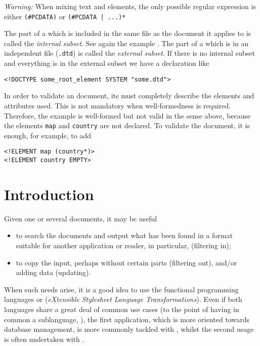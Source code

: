 \emph{Warning:} When mixing text and elements, the only possible
regular expression is either \verb|(#PCDATA)| or
\verb/(#PCDATA | ...)*/

The part of a \DTD which is included in the same file as the \XML
document it applies to is called the \emph{internal subset}. See
again the example . The part of a
\DTD which is in an independent file (\texttt{.dtd}) is called the
\emph{external subset}. If there is no internal subset and
everything is in the external subset we have a declaration like
\begin{verbatim}
<!DOCTYPE some_root_element SYSTEM "some.dtd">
\end{verbatim}
In order to validate an \XML document, its \DTD must completely
describe the elements and attributes used.  This is not mandatory when
well\hyp{}formedness is required. Therefore, the example
 is well\hyp{}formed but not valid in
the sense above, because the elements \texttt{map} and
\texttt{country} are not declared. To validate the document, it is
enough, for example, to add
\begin{verbatim}
<!ELEMENT map (country*)>
<!ELEMENT country EMPTY>
\end{verbatim}

\section{Introduction}

\noindent Given one or several \XML documents, it may be useful
\begin{itemize}

  \item to search the documents and output what has been found in a
  format suitable for another application or reader, in particular,
  \XML (filtering in);

  \item to copy the input, perhaps without certain parts (filtering
  out), and/or adding data (updating).

\end{itemize}
When such needs arise, it is a good idea to use the functional
programming languages \XQuery or \XSLT (\emph{eXtensible Stylesheet
  Language Transformations}). Even if both languages share a great
deal of common use cases (to the point of having in common a
sublanguage, \XPath), the first application, which is more oriented
towards database management, is more commonly tackled with \XQuery,
whilst the second usage is often undertaken with \XSLT.

